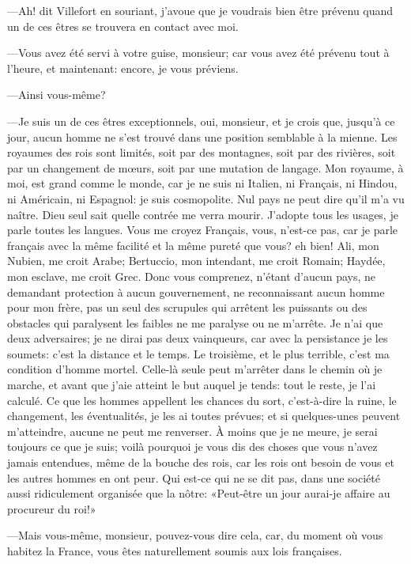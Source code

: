 —Ah! dit Villefort en souriant, j'avoue que je voudrais bien être prévenu quand un de ces êtres se trouvera en contact avec moi. 

—Vous avez été servi à votre guise, monsieur; car vous avez été prévenu tout à l'heure, et maintenant: encore, je vous préviens. 

—Ainsi vous-même? 

—Je suis un de ces êtres exceptionnels, oui, monsieur, et je crois que, jusqu'à ce jour, aucun homme ne s'est trouvé dans une position semblable à la mienne. Les royaumes des rois sont limités, soit par des montagnes, soit par des rivières, soit par un changement de mœurs, soit par une mutation de langage. Mon royaume, à moi, est grand comme le monde, car je ne suis ni Italien, ni Français, ni Hindou, ni Américain, ni Espagnol: je suis cosmopolite. Nul pays ne peut dire qu'il m'a vu naître. Dieu seul sait quelle contrée me verra mourir. J'adopte tous les usages, je parle toutes les langues. Vous me croyez Français, vous, n'est-ce pas, car je parle français avec la même facilité et la même pureté que vous? eh bien! Ali, mon Nubien, me croit Arabe; Bertuccio, mon intendant, me croit Romain; Haydée, mon esclave, me croit Grec. Donc vous comprenez, n'étant d'aucun pays, ne demandant protection à aucun gouvernement, ne reconnaissant aucun homme pour mon frère, pas un seul des scrupules qui arrêtent les puissants ou des obstacles qui paralysent les faibles ne me paralyse ou ne m'arrête. Je n'ai que deux adversaires; je ne dirai pas deux vainqueurs, car avec la persistance je les soumets: c'est la distance et le temps. Le troisième, et le plus terrible, c'est ma condition d'homme mortel. Celle-là seule peut m'arrêter dans le chemin où je marche, et avant que j'aie atteint le but auquel je tends: tout le reste, je l'ai calculé. Ce que les hommes appellent les chances du sort, c'est-à-dire la ruine, le changement, les éventualités, je les ai toutes prévues; et si quelques-unes peuvent m'atteindre, aucune ne peut me renverser. À moins que je ne meure, je serai toujours ce que je suis; voilà pourquoi je vous dis des choses que vous n'avez jamais entendues, même de la bouche des rois, car les rois ont besoin de vous et les autres hommes en ont peur. Qui est-ce qui ne se dit pas, dans une société aussi ridiculement organisée que la nôtre: «Peut-être un jour aurai-je affaire au procureur du roi!»  

—Mais vous-même, monsieur, pouvez-vous dire cela, car, du moment où vous habitez la France, vous êtes naturellement soumis aux lois françaises. 

